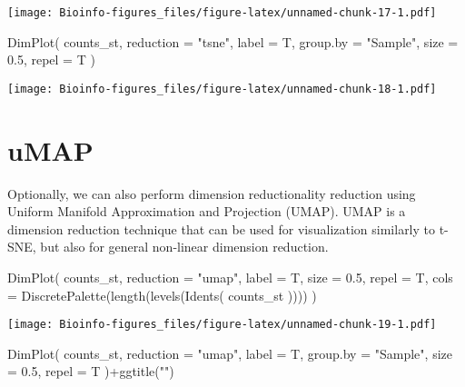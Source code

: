 \documentclass[
  openany]{book}
\newenvironment{Shaded}{\begin{snugshade}}{\end{snugshade}}
\newcommand{\AttributeTok}[1]{\textcolor[rgb]{0.77,0.63,0.00}{#1}}
\newcommand{\FloatTok}[1]{\textcolor[rgb]{0.00,0.00,0.81}{#1}}
\newcommand{\FunctionTok}[1]{\textcolor[rgb]{0.00,0.00,0.00}{#1}}
\newcommand{\NormalTok}[1]{#1}
\newcommand{\SpecialCharTok}[1]{\textcolor[rgb]{0.00,0.00,0.00}{#1}}
\newcommand{\StringTok}[1]{\textcolor[rgb]{0.31,0.60,0.02}{#1}}
\begin{document}
\texttt{[image: Bioinfo-figures\_files/figure-latex/unnamed-chunk-17-1.pdf]}

\begin{Shaded}
\begin{Highlighting}[]
\FunctionTok{DimPlot}\NormalTok{(}
\NormalTok{  counts\_st,}
  \AttributeTok{reduction =} \StringTok{"tsne"}\NormalTok{,}
  \AttributeTok{label =}\NormalTok{ T,}
  \AttributeTok{group.by =} \StringTok{"Sample"}\NormalTok{,}
  \AttributeTok{size =} \FloatTok{0.5}\NormalTok{,}
  \AttributeTok{repel =}\NormalTok{ T}
\NormalTok{)}
\end{Highlighting}
\end{Shaded}

\texttt{[image: Bioinfo-figures\_files/figure-latex/unnamed-chunk-18-1.pdf]}

\clearpage

\hypertarget{umap}{%
\section{uMAP}\label{umap}}

Optionally, we can also perform dimension reductionality reduction using Uniform Manifold Approximation and Projection (UMAP). UMAP is a dimension reduction technique that can be used for visualization similarly to t-SNE, but also for general non-linear dimension reduction.

\begin{Shaded}
\begin{Highlighting}[]
\FunctionTok{DimPlot}\NormalTok{(}
\NormalTok{  counts\_st,}
  \AttributeTok{reduction =} \StringTok{"umap"}\NormalTok{,}
  \AttributeTok{label =}\NormalTok{ T,}
  \AttributeTok{size =} \FloatTok{0.5}\NormalTok{,}
  \AttributeTok{repel =}\NormalTok{ T,}
  \AttributeTok{cols =} \FunctionTok{DiscretePalette}\NormalTok{(}\FunctionTok{length}\NormalTok{(}\FunctionTok{levels}\NormalTok{(}\FunctionTok{Idents}\NormalTok{(}
\NormalTok{    counts\_st}
\NormalTok{  ))))}
\NormalTok{)}
\end{Highlighting}
\end{Shaded}

\texttt{[image: Bioinfo-figures\_files/figure-latex/unnamed-chunk-19-1.pdf]}

\begin{Shaded}
\begin{Highlighting}[]
\FunctionTok{DimPlot}\NormalTok{(}
\NormalTok{  counts\_st,}
  \AttributeTok{reduction =} \StringTok{"umap"}\NormalTok{,}
  \AttributeTok{label =}\NormalTok{ T,}
  \AttributeTok{group.by =} \StringTok{"Sample"}\NormalTok{,}
  \AttributeTok{size =} \FloatTok{0.5}\NormalTok{,}
  \AttributeTok{repel =}\NormalTok{ T}
\NormalTok{)}\SpecialCharTok{+}\FunctionTok{ggtitle}\NormalTok{(}\StringTok{""}\NormalTok{)}
\end{Highlighting}
\end{Shaded}
\end{document}
